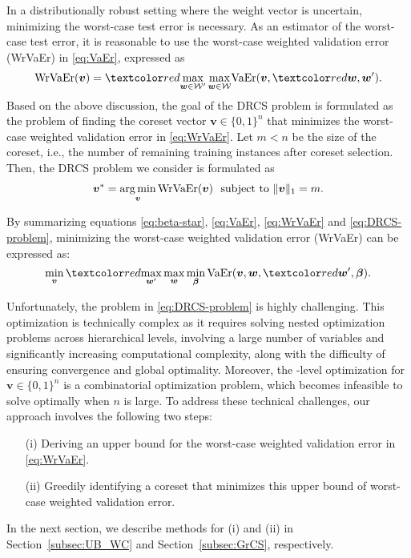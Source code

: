 In a distributionally robust setting where the weight vector is uncertain, minimizing the worst-case test error is necessary.  
%
As an estimator of the worst-case test error, it is reasonable to use the worst-case weighted validation error (WrVaEr) in \eqref{eq:VaEr}, expressed as  
\begin{align}
\label{eq:WrVaEr}
{\rm WrVaEr}(\bm{v}) 
= 
\red{\max_{\bm{w} \in {\cW}^\prime}
\max_{\bm{w} \in {\cW}}}
{\rm VaEr}(\bm{v}, \red{\bm{w}, \bm{w}^\prime}).
\end{align}
%
Based on the above discussion, the goal of the DRCS problem is formulated as the problem of finding the coreset vector $\bm v \in \{0, 1\}^n$ that minimizes the worst-case weighted validation error in \eqref{eq:WrVaEr}.
%
Let
$m < n$
be the size of the coreset, i.e., the number of remaining training instances after coreset selection.
%
Then, the DRCS problem we consider is formulated as 
\begin{align}
\label{eq:DRCS-problem}
\bm{v}^* = \operatorname*{arg\,min}_{\bm{v}} {\rm WrVaEr}(\bm{v})
 ~
\text{ subject to } \|\bm{v}\|_1 = m.
\end{align}

By summarizing equations \ref{eq:beta-star}, \ref{eq:VaEr}, \ref{eq:WrVaEr} and \ref{eq:DRCS-problem}, minimizing the worst-case weighted validation error (WrVaEr) can be expressed as:
\begin{equation} \label{eq:obj-acc-lb}
  \min_{\bm v} \red{\max_{\bm w^\prime}} \max_{\bm w} \min_{\bm \beta} {\rm VaEr}(\bm{v}, \bm{w}, \red{\bm{w}^\prime}, \bm{\beta}).
\end{equation}

Unfortunately, the problem in \eqref{eq:DRCS-problem} is highly challenging.  
%
%
This optimization is technically complex as it requires solving nested optimization problems across  hierarchical levels, involving a large number of variables and significantly increasing computational complexity, along with the difficulty of ensuring convergence and global optimality.  
%
Moreover, the -level optimization for $ \bm{v} \in \{0, 1\}^n $ is a combinatorial optimization problem, which becomes infeasible to solve optimally when $ n $ is large.  
%
To address these technical challenges, our approach involves the following two steps:  
\begin{itemize}  
 \item [(i)] Deriving an upper bound for the worst-case weighted validation error in \eqref{eq:WrVaEr}.  
 \item [(ii)] Greedily identifying a coreset that minimizes this upper bound of worst-case weighted validation error.
\end{itemize}
%
In the next section, we describe methods for (i) and (ii) in Section~\ref{subsec:UB_WC} and Section~\ref{subsec:GrCS}, respectively.  


